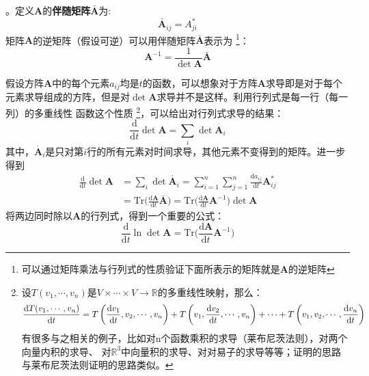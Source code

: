     。定义$\bm{A}$的\textbf{伴随矩阵}$\bar{\bm{A}}$为:
    \begin{equation}
        \bar{\bm{A}}_{ij} = A_{ji}^* 
    \end{equation}
    矩阵$\bm{A}$的逆矩阵（假设可逆）可以用伴随矩阵$\bar{\bm{A}}$表示为
    \footnote{可以通过矩阵乘法与行列式的性质验证下面所表示的矩阵就是$\bm{A}$的逆矩阵}：
    \begin{equation}
        \bm{A}^{-1} = \frac{1}{\det{\bm{A}}}\bm{\bar{A}}
    \end{equation}
    \par 
    假设方阵$\bm{A}$中的每个元素$a_{ij}$均是$t$的函数，可以想象对于方阵$\bm{A}$求导即是对于每个
    元素求导组成的方阵，但是对$\det \bm{A}$求导并不是这样。利用行列式是每一行（每一列）的多重线性
    函数这个性质
    \footnote{
        设$T(v_1,\cdots,v_n)$是$V\times\cdots\times V \to \mathbb{R}$的多重线性映射，那么：
        \begin{equation}
            \frac{\mathrm{d}{T(v_1,\cdots,v_n)}}{\mathrm{d}{t}} = T\left(\frac{\mathrm{d}{v_1}}{\mathrm{d}{t}}, v_2, \cdots, v_n\right) + T\left(v_1, \frac{\mathrm{d}{v_2}}{\mathrm{d}{t}}, \cdots, v_n\right)
             + \cdots + T\left(v_1, v_2, \cdots, \frac{\mathrm{d}{v_n}}{\mathrm{d}{t}}\right)
        \end{equation}
        有很多与之相关的例子，比如对n个函数乘积的求导（莱布尼茨法则），对两个向量内积的求导、
        对$\mathbb{R}^3$中向量积的求导、对对易子的求导等等；证明的思路与莱布尼茨法则证明的思路类似。
    }，可以给出对行列式求导的结果：
    \begin{equation}
        \frac {\mathrm{d}}{\mathrm{d}t} \det{\bm{A}} = \sum_i \det{\dot{\bm{A}_{i}}}
    \end{equation}
    其中，$\dot{\bm{A}_{i}}$是只对第$i$行的所有元素对时间求导，其他元素不变得到的矩阵。进一步得到
    \begin{equation}
        \begin{split}
            \frac {\mathrm{d}}{\mathrm{d}t} \det{\bm{A}} &= \sum_i \det{\dot{\bm{A}_i}} = \sum_{i=1}^n \sum_{j=1}^n \frac {\mathrm{d}a_{ij}}{\mathrm{d}t} \bm{A}_{ij}^*\\
        &= \mathrm{Tr} \bigg(\frac {\mathrm{d}\bm{A}}{\mathrm{d}t} \bar{\bm{A}}\bigg) = \mathrm{Tr} \bigg(\frac {\mathrm{d}\bm{A}}{\mathrm{d}t} \bm{A}^{-1}\bigg) \det{\bm{A}}
        \end{split}
    \end{equation}
    将两边同时除以$\bm{A}$的行列式，得到一个重要的公式：
    \begin{equation}
        \frac {\mathrm{d}}{\mathrm{d}t} \ln{\det{\bm{A}}} = \mathrm{Tr} \bigg(\frac {\mathrm{d}\bm{A}}{\mathrm{d}t} \bm{A}^{-1}\bigg)
    \end{equation}
